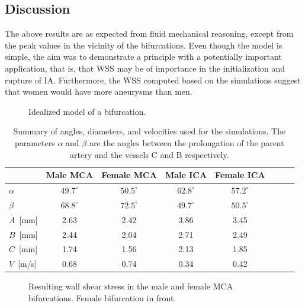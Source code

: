 \subsection{Discussion}

The above results are as expected from fluid mechanical reasoning,
except from the peak values in the vicinity of the bifurcations. Even
though the model is simple, the aim was to demonstrate a principle
with a potentially important application, that is, that WSS may be of
importance in the initialization and rupture of IA.  Furthermore, the
WSS computed based on the simulations suggest that women would have
more aneurysms than men.

\begin{figure}
  \begin{center}
  \end{center}
  \caption{Idealized model of a bifurcation.}
\end{figure}

\begin{table}
  \begin{center}
    \begin{tabular}{l*{6}{c}r}
      & Male MCA & Female MCA & Male ICA & Female ICA \\
      \hline
      $\alpha$	  & $49.7^\circ$ & $50.5^\circ$   & $62.8^\circ$ & $57.2^\circ$\\
$\beta$		  & $68.8^\circ$ & $72.5^\circ$   & $49.7^\circ$ & $50.5^\circ$\\
      $A$~[mm]		  & 2.63 & 2.42   & 3.86 & 3.45\\
      $B$~[mm]           & 2.44 & 2.04   & 2.71 & 2.49\\
      $C$~[mm] 	  & 1.74 & 1.56   & 2.13 & 1.85\\
      $V$~[m/s]	  & 0.68   & 0.74     & 0.34   & 0.42  \\
    \end{tabular}
  \end{center}
  \caption{Summary of angles, diameters, and velocities used for the
    simulations. The parameters $\alpha$ and $\beta$ are the angles
    between the prolongation of the parent artery and the vessels C
    and B respectively. \label{bcs}}
\end{table}

\begin{figure}
  \begin{center}
    \caption{Resulting wall shear stress in the male and female MCA
      bifurcations. Female bifurcation in front. }
    \label{fig:mca_wss_res}
  \end{center}
\end{figure}

